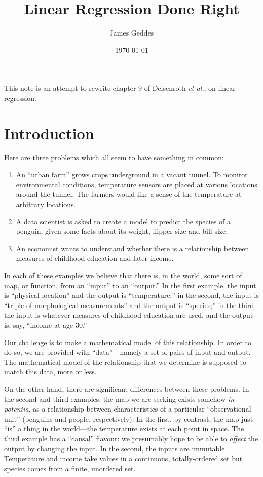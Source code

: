 \documentclass[11pt, a4paper]{article}
\author{James Geddes}
\date{\today}
\title{Linear Regression Done Right}
\begin{document}
\maketitle

This note is an attempt to rewrite chapter 9 of Deisenroth \emph{et
al.}, on linear regression.

\section*{Introduction}

Here are three problems which all seem to have something in common:

\begin{enumerate}
\item An ``urban farm'' grows crops underground in a vacant tunnel. To
  monitor environmental conditions, temperature sensors are placed at
  various locations around the tunnel. The farmers would like a sense
  of the temperature at arbitrary locations.
\item A data scientist is asked to create a model to predict the
  species of a penguin, given some facts about its weight, flipper
  size and bill size.
\item An economist wants to understand whether there is a relationship
  between measures of childhood education and later income.
\end{enumerate}

In each of these examples we believe that there is, in the world, some
sort of map, or function, from an “input” to an “output.” In the first
example, the input is “physical location” and the output is
“temperature;” in the second, the input is “triple of morphological
measurements” and the output is “species;” in the third, the input is
whatever measures of childhood education are used, and the output is,
say, “income at age 30.”

Our challenge is to make a mathematical model of this relationship. In
order to do so, we are provided with “data”---namely a set of pairs of
input and output. The mathematical model of the relationship that we
determine is supposed to match this data, more or less.

On the other hand, there are significant differences between these
problems. In the second and third examples, the map we are seeking
exists somehow \emph{in potentia}, as a relationship between
characteristics of a particular “observational unit” (penguins and
people, respectively). In the first, by contrast, the map just “is” a
thing in the world---the temperature exists at each point in space. The
third example has a “causal” flavour: we presumably hope to be able to
\emph{affect} the output by changing the input. In the second, the
inputs are immutable. Temperature and income take values in a
continuous, totally-ordered set but species comes from a finite,
unordered set. 
\end{document}
